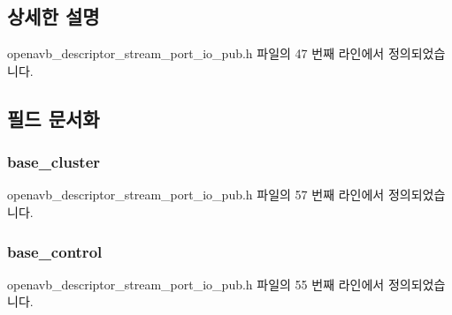 \subsection{상세한 설명}


openavb\+\_\+descriptor\+\_\+stream\+\_\+port\+\_\+io\+\_\+pub.\+h 파일의 47 번째 라인에서 정의되었습니다.



\subsection{필드 문서화}
\subsubsection[{\texorpdfstring{base\+\_\+cluster}{base_cluster}}]{ base\+\_\+cluster}\hypertarget{structopenavb__aem__descriptor__stream__port__io__t_a8ec7bc49bd5addbc5a5004b78d22db14}{}\label{structopenavb__aem__descriptor__stream__port__io__t_a8ec7bc49bd5addbc5a5004b78d22db14}


openavb\+\_\+descriptor\+\_\+stream\+\_\+port\+\_\+io\+\_\+pub.\+h 파일의 57 번째 라인에서 정의되었습니다.

\subsubsection[{\texorpdfstring{base\+\_\+control}{base_control}}]{ base\+\_\+control}\hypertarget{structopenavb__aem__descriptor__stream__port__io__t_af2706407b5397c06e6f4c45474ba75d3}{}\label{structopenavb__aem__descriptor__stream__port__io__t_af2706407b5397c06e6f4c45474ba75d3}


openavb\+\_\+descriptor\+\_\+stream\+\_\+port\+\_\+io\+\_\+pub.\+h 파일의 55 번째 라인에서 정의되었습니다.

